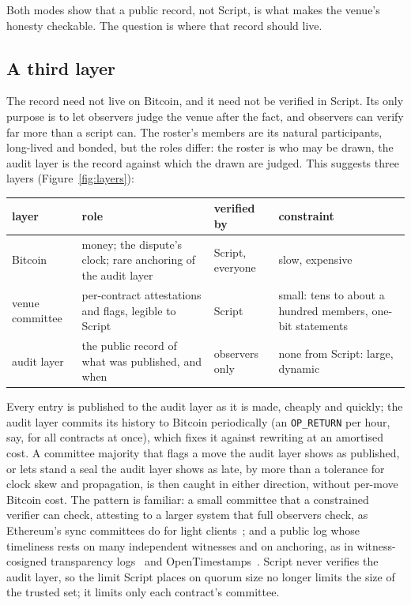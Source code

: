 \documentclass[11pt]{article}
\begin{document}
Both modes show that a public
record, not Script, is what makes the venue's honesty checkable. The
question is where that record should live.

\subsection{A third layer}
\label{sec:audit}

The record need not live on Bitcoin, and it need not be verified in
Script. Its only purpose is to let observers judge the venue after the
fact, and observers can verify far more than a script can. The
roster's members are its natural participants, long-lived and bonded,
but the roles differ: the roster is who may be drawn, the audit layer is
the record against which the drawn are judged. This suggests three
layers (Figure~\ref{fig:layers}):

\begin{center}
\small
\begin{tabular}{>{\raggedright\arraybackslash}p{27mm}>{\raggedright\arraybackslash}p{50mm}>{\raggedright\arraybackslash}p{27mm}>{\raggedright\arraybackslash}p{30mm}}
\toprule
layer & role & verified by & constraint \\
\midrule
Bitcoin & money; the dispute's clock; rare anchoring of the audit layer & Script, everyone & slow, expensive \\
venue committee & per-contract attestations and flags, legible to Script & Script & small: tens to about a hundred members, one-bit statements \\
audit layer & the public record of what was published, and when & observers only & none from Script: large, dynamic \\
\bottomrule
\end{tabular}
\end{center}

Every entry is published to the audit layer as it is made, cheaply and
quickly; the audit layer commits its history to Bitcoin periodically
(an \texttt{OP\_RETURN} per hour, say, for all contracts at once), which
fixes it against rewriting at an amortised cost. A committee majority
that flags a move the audit layer shows as published, or lets stand a
seal the audit layer shows as late, by more than a tolerance for clock
skew and propagation, is then caught in either direction,
without per-move Bitcoin cost. The pattern is familiar: a small
committee that a constrained verifier can check, attesting to a larger
system that full observers check, as Ethereum's sync committees do for
light clients~\cite{synccommittee}; and a public log whose timeliness
rests on many independent witnesses and on anchoring, as in
witness-cosigned transparency logs~\cite{ct} and
OpenTimestamps~\cite{ots}. Script never verifies the audit layer, so the
limit Script places on quorum size no longer limits the size of the
trusted set; it limits only each contract's committee.
\end{document}
